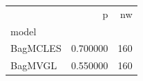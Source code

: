 \begin{tabular}{lrr}
\toprule
 & p & nw \\
model &  &  \\
\midrule
BagMCLES & 0.700000 & 160 \\
BagMVGL & 0.550000 & 160 \\
\bottomrule
\end{tabular}
